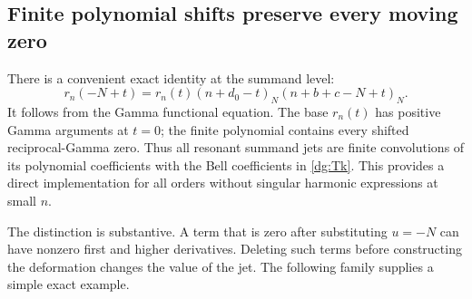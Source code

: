 \subsection{Finite polynomial shifts preserve every moving zero}
There is a convenient exact identity at the summand level:
\begin{equation}\label{dg:polynomialshift}
 \boxed{r_n(-N+t)=r_n(t)
             (n+d_0-t)_N(n+b+c-N+t)_N.}
\end{equation}
It follows from the Gamma functional equation. The base $r_n(t)$ has
positive Gamma arguments at $t=0$; the finite polynomial contains
every shifted reciprocal-Gamma zero. Thus all resonant summand jets
are finite convolutions of its polynomial coefficients with the Bell
coefficients in \eqref{dg:Tk}. This provides a direct implementation
for all orders without singular harmonic expressions at small $n$.

The distinction is substantive. A term that is zero after substituting
$u=-N$ can have nonzero first and higher derivatives. Deleting such
terms before constructing the deformation changes the value of the
jet. The following family supplies a simple exact example.

